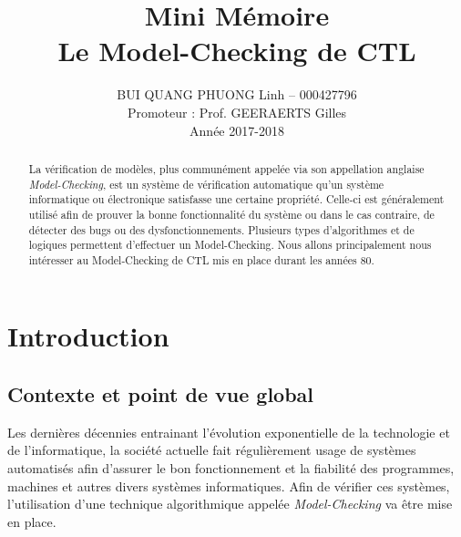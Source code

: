 \documentclass[runningheads,a4paper,10pt]{llncs}
\begin{document}
\mainmatter 

\title{Mini Mémoire \\ Le Model-Checking de CTL}


\author{BUI QUANG PHUONG Linh -- 000427796 \\ Promoteur : Prof. GEERAERTS Gilles \\ Année 2017-2018}



\tocauthor{{}}

\maketitle


\begin{abstract}
La vérification de modèles, plus communément appelée via son appellation anglaise \textit{Model-Checking}, est un système de vérification automatique qu'un système informatique ou électronique satisfasse une certaine propriété. Celle-ci est généralement utilisé afin de prouver la bonne fonctionnalité du système ou dans le cas contraire, de détecter des bugs ou des dysfonctionnements. Plusieurs types d'algorithmes et de logiques permettent d'effectuer un Model-Checking. Nous allons principalement nous intéresser au Model-Checking de CTL mis en place durant les années 80. 
\end{abstract}

\medskip

\begingroup
\let\clearpage\relax
\tableofcontents
\endgroup

\medskip
\medskip

\newpage 

\section{Introduction}

\subsection{Contexte et point de vue global}
\noindent
Les dernières décennies entrainant l'évolution exponentielle de la technologie et de l'informatique, la société actuelle fait régulièrement usage de systèmes automatisés afin d'assurer le bon fonctionnement et la fiabilité des programmes, machines et autres divers systèmes informatiques. Afin de vérifier ces systèmes, l'utilisation d'une technique algorithmique appelée \textit{Model-Checking} va être mise en place.  
\end{document}
